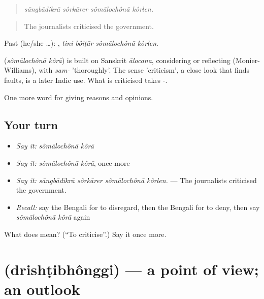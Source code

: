 \begin{quote}
   
\end{quote}

\begin{quote}
\emph{sāngbādikrā sôrkārer sômālochônā kôrlen.}
\end{quote}

\begin{quote}
The journalists criticised the government.
\end{quote}

Past (he/she …):    , \emph{tini bôiṭār sômālochônā kôrlen}.

\begin{cousinweb}
\textbf{ } (\emph{sômālochônā kôrā}) is built on Sanskrit \emph{ālocana}, considering or reflecting (Monier-Williams), with \emph{sam-} 'thoroughly'. The sense 'criticism', a close look that finds faults, is a later Indic use. What is criticised takes -.
\end{cousinweb}

\begin{grammarlens}[title={What you've built}]
One more word for giving reasons and opinions.
\end{grammarlens}

\subsection*{Your turn}
\begin{itemize}
\raggedright
  \item \emph{Say it:} \emph{sômālochônā kôrā}
  \item \emph{Say it:} \emph{sômālochônā kôrā}, once more
  \item \emph{Say it:} \emph{sāngbādikrā sôrkārer sômālochônā kôrlen.} — The journalists criticised the government.
  \item \emph{Recall:} say the Bengali for to disregard, then the Bengali for to deny, then say \emph{sômālochônā kôrā} again
\end{itemize}

\begin{tcolorbox}[breakable,colback=teal!4,colframe=teal!35!black,title={Before you move on}]
What does   mean? (\textquotedblleft{}To criticise\textquotedblright{}.) Say it once more.
\end{tcolorbox}
\section[\texorpdfstring{\bn{দৃষ্টিভঙ্গি} (drishṭibhônggi)}{দৃষ্টিভঙ্গি (drishṭibhônggi)}]{ (drishṭibhônggi) — a point of view; an outlook}

